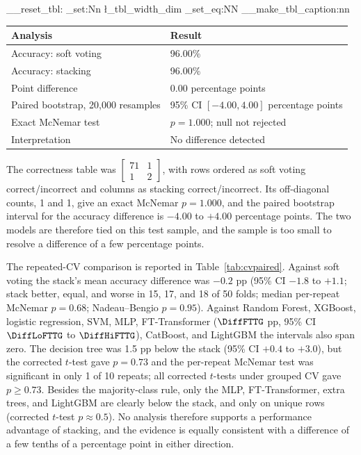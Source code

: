 \documentclass[a4paper,fleqn]{cas-dc}
\begin{document}
\par\nopagebreak\smallskip
\noindent\begin{minipage}{\columnwidth}
\centering
\makeatletter
\ExplSyntaxOn
\__reset_tbl:
\dim_set:Nn \l_tbl_width_dim { \columnwidth }
\cs_set_eq:NN \@makecaption \__make_tbl_caption:nn
\ExplSyntaxOff
\makeatother
{}
\label{tab:stats}
\footnotesize
\setlength{\tabcolsep}{3pt}
\renewcommand{\arraystretch}{1.05}
\begin{tabularx}{\columnwidth}{@{}Q{0.42\columnwidth}Y@{}}
\toprule
Analysis & Result \\
\midrule
Accuracy: soft voting & 96.00\% \\
Accuracy: stacking & 96.00\% \\
Point difference & 0.00 percentage points \\
Paired bootstrap, 20,000 resamples & 95\% CI $[-4.00,4.00]$ percentage points \\
Exact McNemar test & $p=1.000$; null not rejected \\
Interpretation & No difference detected \\
\bottomrule
\end{tabularx}
\end{minipage}
\par\smallskip


The correctness table was $\begin{bmatrix}71&1\\1&2\end{bmatrix}$, with rows ordered as soft voting correct/incorrect and columns as stacking correct/incorrect. Its off-diagonal counts, 1 and 1, give an exact McNemar $p=1.000$, and the paired bootstrap interval for the accuracy difference is $-4.00$ to $+4.00$ percentage points. The two models are therefore tied on this test sample, and the sample is too small to resolve a difference of a few percentage points.


The repeated-CV comparison is reported in Table~\ref{tab:cvpaired}. Against soft voting the stack's mean accuracy difference was $-0.2$ pp (95\% CI $-1.8$ to $+1.1$; stack better, equal, and worse in 15, 17, and 18 of 50 folds; median per-repeat McNemar $p=0.68$; Nadeau--Bengio $p=0.95$). Against Random Forest, XGBoost, logistic regression, SVM, MLP, FT-Transformer ($\DiffFTTG$ pp, 95\% CI $\DiffLoFTTG$ to $\DiffHiFTTG$), CatBoost, and LightGBM the intervals also span zero. The decision tree was 1.5 pp below the stack (95\% CI $+0.4$ to $+3.0$), but the corrected $t$-test gave $p=0.73$ and the per-repeat McNemar test was significant in only 1 of 10 repeats; all corrected $t$-tests under grouped CV gave $p\geq0.73$. Besides the majority-class rule, only the MLP, FT-Transformer, extra trees, and LightGBM are clearly below the stack, and only on unique rows (corrected $t$-test $p\approx0.5$). No analysis therefore supports a performance advantage of stacking, and the evidence is equally consistent with a difference of a few tenths of a percentage point in either direction.
\end{document}
